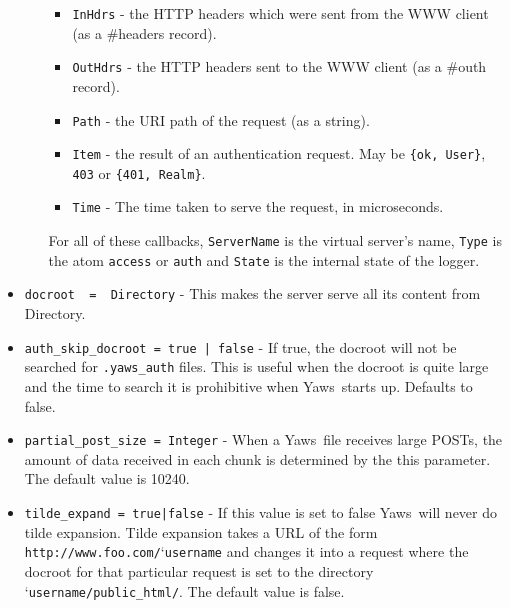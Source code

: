 \documentclass[11pt,oneside,english]{book}
\newcommand{\Yaws}            %
        {{\sc Yaws}}
\begin{document}
\begin{itemize}
\begin{itemize}
\begin{itemize}
                        \item \verb+InHdrs+ - the HTTP headers which were sent
                          from the WWW client (as a \#headers{} record).

                        \item \verb+OutHdrs+ - the HTTP headers sent to the WWW
                          client (as a \#outh{} record).

                        \item \verb+Path+ - the URI path of the request (as a
                          string).

                        \item \verb+Item+ - the result of an authentication
                          request. May be \verb+{ok, User}+, \verb+403+ or
                          \verb+{401, Realm}+.

                        \item \verb+Time+ - The time taken to serve the request,
                          in microseconds.

                        \end{itemize}

              For all of these callbacks, \verb+ServerName+ is the virtual
              server's name, \verb+Type+ is the atom \verb+access+ or
              \verb+auth+ and \verb+State+ is the internal state of the logger.

              \end{itemize}

\item       \verb+docroot  =  Directory+ -
              This makes the server serve all its content from
              Directory.

\item       \verb+auth_skip_docroot = true | false+ -
              If true, the docroot will not be searched for
              \verb+.yaws_auth+ files. This is useful when the docroot
              is quite large and the time to search it is prohibitive
              when \Yaws\  starts up. Defaults to false.

\item       \verb+partial_post_size = Integer+ -
              When a \Yaws\  file receives large  POSTs,  the
              amount  of  data  received  in each chunk is
              determined by the this parameter.  The default
              value is 10240.

\item       \verb+tilde_expand = true|false+ -
              If  this  value  is  set  to false \Yaws\  will
              never do tilde  expansion.  Tilde expansion takes a URL
              of the form
              \verb+http://www.foo.com/+\char`\~\verb+username+ and
              changes it into a request where the docroot for that
              particular request is set to the directory
              \char`\~\verb+username/public_html/+. The default value
              is false.


\end{itemize}
\end{document}
